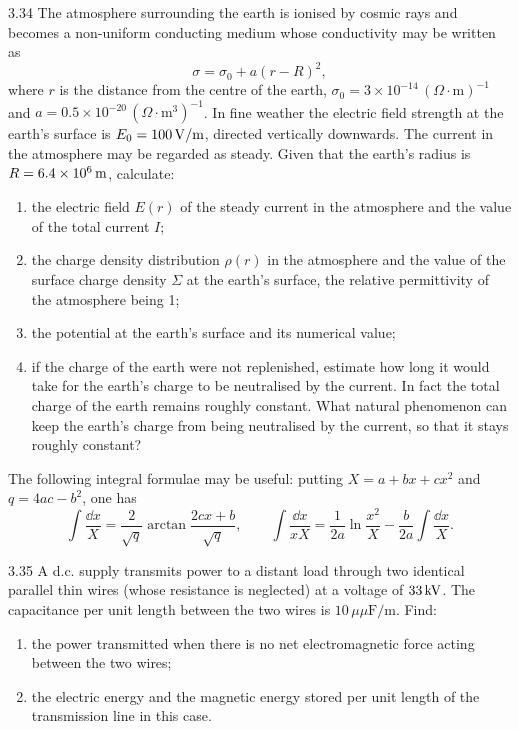 \begin{problem}{3.34}
The atmosphere surrounding the earth is ionised by cosmic rays and becomes a non-uniform conducting medium whose conductivity may be written as
\begin{equation*}
\sigma=\sigma_0+a(r-R)^2,
\end{equation*}
where $r$ is the distance from the centre of the earth, $\sigma_0=3\times10^{-14}\,(\Omega\cdot\mathrm{m})^{-1}$ and $a=0.5\times10^{-20}\,(\Omega\cdot\mathrm{m}^3)^{-1}$. In fine weather the electric field strength at the earth's surface is $E_0=100\,\mathrm{V/m}$, directed vertically downwards. The current in the atmosphere may be regarded as steady. Given that the earth's radius is $R=6.4\times10^{6}\,\mathrm{m}$, calculate:
\begin{enumerate}[label=(\arabic*),leftmargin=2.2em,itemsep=1pt,topsep=2pt]
\item the electric field $E(r)$ of the steady current in the atmosphere and the value of the total current $I$;
\item the charge density distribution $\rho(r)$ in the atmosphere and the value of the surface charge density $\Sigma$ at the earth's surface, the relative permittivity of the atmosphere being 1;
\item the potential at the earth's surface and its numerical value;
\item if the charge of the earth were not replenished, estimate how long it would take for the earth's charge to be neutralised by the current. In fact the total charge of the earth remains roughly constant. What natural phenomenon can keep the earth's charge from being neutralised by the current, so that it stays roughly constant?
\end{enumerate}
The following integral formulae may be useful: putting $X=a+bx+cx^2$ and $q=4ac-b^2$, one has
\begin{equation*}
\int\frac{\dd x}{X}=\frac{2}{\sqrt{q}}\arctan\frac{2cx+b}{\sqrt{q}},\qquad
\int\frac{\dd x}{xX}=\frac{1}{2a}\ln\frac{x^2}{X}-\frac{b}{2a}\int\frac{\dd x}{X}.
\end{equation*}
\end{problem}

\begin{problem}{3.35}
A d.c. supply transmits power to a distant load through two identical parallel thin wires (whose resistance is neglected) at a voltage of $33\,\mathrm{kV}$. The capacitance per unit length between the two wires is $10\,\mu\mu\mathrm{F/m}$. Find:
\begin{enumerate}[label=(\arabic*),leftmargin=2.2em,itemsep=1pt,topsep=2pt]
\item the power transmitted when there is no net electromagnetic force acting between the two wires;
\item the electric energy and the magnetic energy stored per unit length of the transmission line in this case.
\end{enumerate}
\end{problem}

